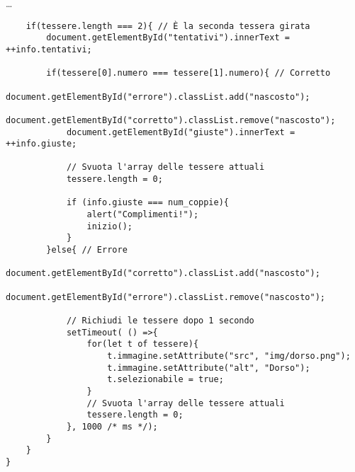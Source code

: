 \begin{frame}[fragile]\transfade
  \begin{sol}\centering\dots
\begin{verbatim}
    if(tessere.length === 2){ // È la seconda tessera girata
        document.getElementById("tentativi").innerText = ++info.tentativi;

        if(tessere[0].numero === tessere[1].numero){ // Corretto
            document.getElementById("errore").classList.add("nascosto");
            document.getElementById("corretto").classList.remove("nascosto");
            document.getElementById("giuste").innerText = ++info.giuste;

            // Svuota l'array delle tessere attuali
            tessere.length = 0;

            if (info.giuste === num_coppie){
                alert("Complimenti!");
                inizio();
            }
        }else{ // Errore
            document.getElementById("corretto").classList.add("nascosto");
            document.getElementById("errore").classList.remove("nascosto");

            // Richiudi le tessere dopo 1 secondo
            setTimeout( () =>{
                for(let t of tessere){
                    t.immagine.setAttribute("src", "img/dorso.png");
                    t.immagine.setAttribute("alt", "Dorso");
                    t.selezionabile = true;
                }
                // Svuota l'array delle tessere attuali
                tessere.length = 0;
            }, 1000 /* ms */);
        }
    }
}
      \end{verbatim}
  \end{sol}
\end{frame}